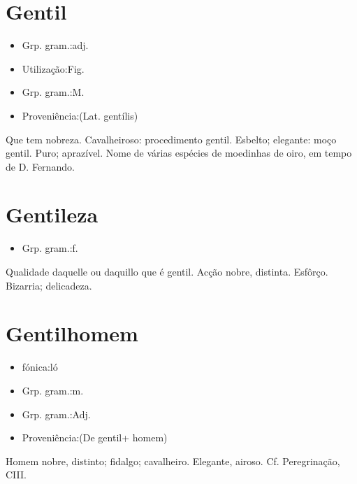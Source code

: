 \section{Gentil}
\begin{itemize}
\item {Grp. gram.:adj.}
\end{itemize}
\begin{itemize}
\item {Utilização:Fig.}
\end{itemize}
\begin{itemize}
\item {Grp. gram.:M.}
\end{itemize}
\begin{itemize}
\item {Proveniência:(Lat. \textunderscore gentílis\textunderscore )}
\end{itemize}
Que tem nobreza.
Cavalheiroso: \textunderscore procedimento gentil\textunderscore .
Esbelto; elegante: \textunderscore moço gentil\textunderscore .
Puro; aprazível.
Nome de várias espécies de moedinhas de oiro, em tempo de D. Fernando.
\section{Gentileza}
\begin{itemize}
\item {Grp. gram.:f.}
\end{itemize}
Qualidade daquelle ou daquillo que é gentil.
Acção nobre, distinta.
Esfôrço.
Bizarria; delicadeza.
\section{Gentilhomem}
\begin{itemize}
\item {fónica:ló}
\end{itemize}
\begin{itemize}
\item {Grp. gram.:m.}
\end{itemize}
\begin{itemize}
\item {Grp. gram.:Adj.}
\end{itemize}
\begin{itemize}
\item {Proveniência:(De \textunderscore gentil\textunderscore  + \textunderscore homem\textunderscore )}
\end{itemize}
Homem nobre, distinto; fidalgo; cavalheiro.
Elegante, airoso. Cf. \textunderscore Peregrinação\textunderscore , CIII.
